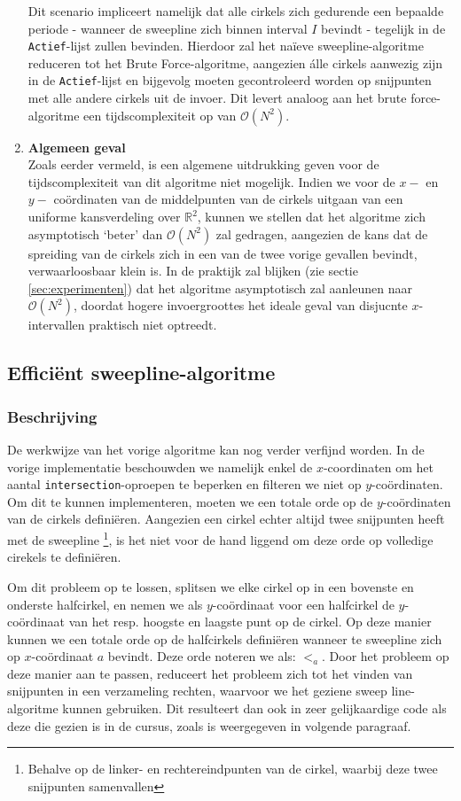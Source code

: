 \documentclass[12pt]{article}
\begin{document}
\begin{enumerate}
		 Dit scenario impliceert namelijk dat alle cirkels zich gedurende een bepaalde periode - wanneer de sweepline zich binnen interval $ I $ bevindt - tegelijk in de \texttt{Actief}-lijst zullen bevinden. Hierdoor zal het naïeve sweepline-algoritme reduceren tot het Brute Force-algoritme, aangezien álle cirkels aanwezig zijn in de \texttt{Actief}-lijst en bijgevolg moeten gecontroleerd worden op snijpunten met alle andere cirkels uit de invoer. Dit levert analoog aan het brute force-algoritme een tijdscomplexiteit op van $ \mathcal{O}(N^2) $.
 \item \textbf{Algemeen geval}\\%
 		Zoals eerder vermeld, is een algemene uitdrukking geven voor de tijdscomplexiteit van dit algoritme niet mogelijk. Indien we voor de $ x- $ en $ y- $ coördinaten van de middelpunten van de cirkels uitgaan van een uniforme kansverdeling over $ \mathbb{R}^2 $, kunnen we stellen dat het algoritme zich asymptotisch `beter' dan $ \mathcal{O}(N^2) $ zal gedragen, aangezien de kans dat de spreiding van de cirkels zich in een van de twee vorige gevallen bevindt, verwaarloosbaar klein is. In de praktijk zal blijken (zie sectie \ref{sec:experimenten}) dat het algoritme asymptotisch zal aanleunen naar $\mathcal{O}(N^2)$, doordat hogere invoergroottes het ideale geval van disjucnte $x$-intervallen praktisch niet optreedt.
\end{enumerate}

\subsection{Efficiënt sweepline-algoritme}
\subsubsection{Beschrijving}
De werkwijze van het vorige algoritme kan nog verder verfijnd worden. In de vorige implementatie beschouwden we namelijk enkel de $ x $-coordinaten om het aantal \texttt{intersection}-oproepen te beperken en filteren we niet op $ y $-coördinaten. Om dit te kunnen implementeren, moeten we een totale orde op de $ y $-coördinaten van de cirkels definiëren. Aangezien een cirkel echter altijd twee snijpunten heeft met de sweepline \footnote{Behalve op de linker- en rechtereindpunten van de cirkel, waarbij deze twee snijpunten samenvallen}, is het niet voor de hand liggend om deze orde op volledige cirekels te definiëren. 

Om dit probleem op te lossen, splitsen we elke cirkel op in een bovenste en onderste halfcirkel, en nemen we als $ y $-coördinaat voor een halfcirkel de $ y$-coördinaat van het resp. hoogste en laagste punt op de cirkel. Op deze manier kunnen we een totale orde op de halfcirkels definiëren wanneer te sweepline zich op $x$-coördinaat $ a $ bevindt. Deze orde noteren we als: $ <_a $. Door het probleem op deze manier aan te passen, reduceert het probleem zich tot het vinden van snijpunten in een verzameling rechten, waarvoor we het geziene sweep line-algoritme kunnen gebruiken. Dit resulteert dan ook in zeer gelijkaardige code als deze die gezien is in de cursus, zoals is weergegeven in volgende paragraaf. 
\end{document}
